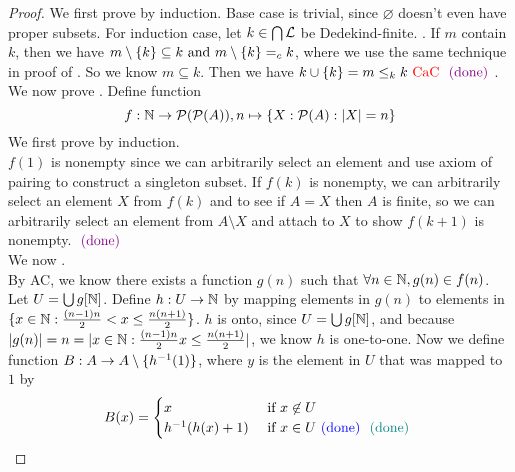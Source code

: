 \documentclass{report}
\begin{document}
\begin{proof}
We first prove  by induction. Base case is trivial, since $\varnothing$ doesn't even have  proper subsets. For induction case, let $k\in \bigcap \mathcal{L} $ be Dedekind-finite. . If $m$ contain  $k$, then we have  $m\setminus \{ k \}\subseteq k\text{ and }m\setminus \{ k \}=_c k$, where we use the same technique in proof of . So we know $m\subseteq k$. Then we have $k\cup \{ k \}=m\leq_k k\text{ \textcolor{red}{CaC} }\textcolor{violet}{\text{ (done) }}$.\\

We now prove . Define function 
\begin{equation}
f:\mathbb{N}\rightarrow \mathcal{P}(\mathcal{P}(A)), n\mapsto \{ X:\mathcal{P}(A):|X|=n \}
\end{equation}
We first prove  by induction.\\

$f(1)$ is nonempty since we can arbitrarily select an element and use axiom of pairing to construct a singleton subset. If $f(k)$ is nonempty, we can arbitrarily select an element $X$ from $f(k)$ and to see if $A=X$ then $A$ is finite, so we can arbitrarily select an element from $A\setminus X$ and attach to $X$ to show  $f(k+1)$ is nonempty.  $\textcolor{violet}{\text{ (done) }}$\\

We now .\\

By AC, we know there exists a function $g(n)$ such that $\forall n\in\mathbb{N}, g(n)\in f(n)$. Let $U=\bigcup g[\mathbb{N}]$. Define $h:U\rightarrow \mathbb{N}$ by mapping elements in $g(n)$ to elements in $\{ x \in\mathbb{N}: \frac{(n-1)n}{2}<x\leq \frac{n(n+1)}{2} \}$. $h$ is onto, since  $U=\bigcup g[\mathbb{N}]$, and because $|g(n)|=n=|x\in\mathbb{N}:\frac{(n-1)n}{2}x\leq \frac{n(n+1)}{2}|$, we know $h$ is one-to-one. Now we define function $B:A\rightarrow A\setminus \{ h^{-1}(1) \}$, where $y$ is the element in  $U$ that was mapped to  $1$ by
\begin{equation}
B(x)=\begin{cases}
  x& \text{ if  }x\not\in U\\
  h^{-1}(h(x)+1)& \text{ if  }x\in U\textcolor{blue}{\text{ (done) }}\textcolor{teal}{\text{ (done) }}
\end{cases}
\end{equation}
\end{proof}
\end{document}
